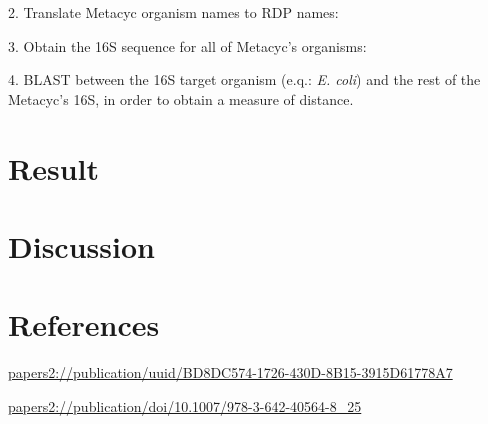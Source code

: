 \documentclass{article}
\begin{document}
2. Translate Metacyc organism names to RDP names:

3. Obtain the 16S sequence for all of Metacyc's organisms:

4. BLAST between the 16S target organism (e.q.: \emph{E. coli}) and the rest of the Metacyc's 16S, in order to obtain a measure of distance.



\section{Result}


\section{Discussion}

\section{References}


\url{papers2://publication/uuid/BD8DC574-1726-430D-8B15-3915D61778A7}

\url{papers2://publication/doi/10.1007/978-3-642-40564-8_25}
\end{document}
